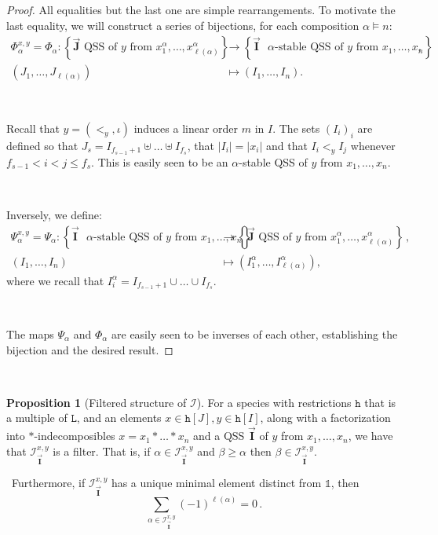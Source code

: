 \documentclass[12pt, reqno]{amsart}
\theoremstyle{definition}
\newtheorem{prop}[thm]{Proposition}
\newtheorem{smpl}[thm]{Example}
\newcommand{\III}{\vec{\mathbf{I}}}
\newcommand{\JJJ}{\vec{\mathbf{J}}}
\DeclareMathOperator{\pat}{\mathbf{pat}}
\begin{document}
\begin{proof}
All equalities but the last one are simple rearrangements.
To motivate the last equality, we will construct a series of bijections, for each composition $\alpha \models n$:
\begin{align*}
    \Phi_{\alpha}^{x, y} = \Phi_{\alpha} : \left\{ \JJJ \text{ QSS of $y$ from $x^{\alpha}_1, \dots, x^{\alpha}_{\ell(\alpha)}$}\right\} &\to \left\{ \III \text{ $\alpha$-stable QSS of $y$ from $x_1, \dots, x_n$}\right\}\, , \\
    (J_1, \dots, J_{\ell(\alpha)} ) &\mapsto (I_1, \dots , I_n).
\end{align*}

\

Recall that $y = (<_y, \iota)$ induces a linear order $m$ in $I$.
The sets $(I_i)_i$ are defined so that $J_s = I_{f_{s-1}+1} \uplus \dots \uplus I_{f_s}$, that $|I_i | = |x_i|$ and that $I_i <_y I_j $ whenever $f_{s-1} < i < j \leq f_{s}$.
This is easily seen to be an $\alpha$-stable QSS of $y$ from $x_1, \dots, x_n$.

\

Inversely, we define:
\begin{align*}
    \Psi_{\alpha}^{x, y} = \Psi_{\alpha}  : \left\{ \III \text{ $\alpha$-stable QSS of $y$ from $x_1, \dots, x_n$}\right\} &\to \left\{ \JJJ \text{ QSS of $y$ from $x^{\alpha}_1, \dots, x^{\alpha}_{\ell(\alpha)}$}\right\} \, , \\
    (I_1, \dots , I_n) &\mapsto (I_1^{\alpha}, \dots, I^{\alpha}_{\ell(\alpha)} ),
\end{align*}
where we recall that $I^{\alpha}_i = I_{f_{s-1}+1} \cup \dots  \cup I_{f_s}$.

\

The maps $\Psi_{\alpha}$ and $\Phi_{\alpha}$ are easily seen to be inverses of each other, establishing the bijection and the desired result.
\end{proof}

\

%

\begin{prop}[Filtered structure of $\mathcal I$]\label{prop:filter_structure_I}
For a species with restrictions $\mathtt{h}$ that is a multiple of $\mathtt{L}$, and an elements $x\in  \mathtt{h}[J], y\in \mathtt{h}[I]$, along with a factorization into $\ast$-indecomposibles $x = x_1 \ast \dots \ast x_n$ and a QSS $\III$ of $y$ from $x_1, \dots, x_n$, we have that $\mathcal I^{ x, y}_{\III}$ is a filter.
That is, if $\alpha \in \mathcal I^{ x, y}_{\III}$ and $\beta \geq \alpha$ then $\beta \in \mathcal I^{ x, y}_{\III}$.

\
Furthermore, if $\mathcal I^{ x, y}_{\III}$ has a unique minimal element distinct from $\mathbb{1}$, then
$$\sum_{\alpha \in \mathcal I^{x, y}_{\III}} (-1)^{\ell(\alpha)} = 0 \, .$$
\end{prop}
\end{document}
